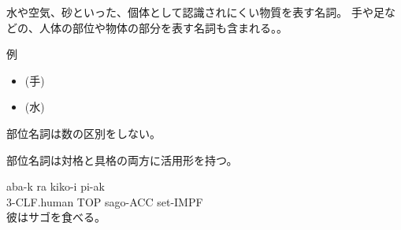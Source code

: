 水や空気、砂といった、個体として認識されにくい物質を表す名詞。
手や足などの、人体の部位や物体の部分を表す名詞も含まれる。。

例
\begin{itemize}
\item {} (手)
\item {} (水)
\end{itemize}

部位名詞は数の区別をしない。

部位名詞は対格と具格の両方に活用形を持つ。

\begin{exe}
    \ex \gll aba-k ra kiko-i pi-ak \\
        3-CLF.human TOP sago-ACC set-IMPF \\
        \glt 彼はサゴを食べる。
\end{exe}
